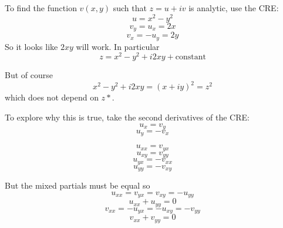\documentclass[11pt, oneside]{article}   	%
\begin{document}
To find the function $v(x,y)$ such that $z = u + iv$ is analytic, use the CRE:
\[ u = x^2 - y^2 \]
\[ v_y = u_x = 2x \]
\[ v_x = - u_y = 2y \]
So it looks like $2xy$ will work.  In particular
\[ z = x^2 - y^2 + i2xy + \text{constant} \]

But of course 
\[  x^2 - y^2 + i2xy = (x + iy)^2 = z^2 \]
which does not depend on $z*$.

To explore why this is true, take the second derivatives of the CRE:
\[ u_x = v_y \]
\[ u_y = - v_x \]

\[ u_{xx} = v_{yx} \]
\[ u_{xy} = v_{yy} \]
\[ u_{yx} = -v_{xx} \]
\[ u_{yy} = -v_{xy} \]

But the mixed partials must be equal so
\[ u_{xx} = v_{yx} = v_{xy} = - u_{yy} \]
\[ u_{xx} + u_{yy} = 0 \]
\[ v_{xx} = -u_{yx} = -u_{xy} = -v_{yy} \]
\[ v_{xx} + v_{yy} = 0 \]
\end{document}
